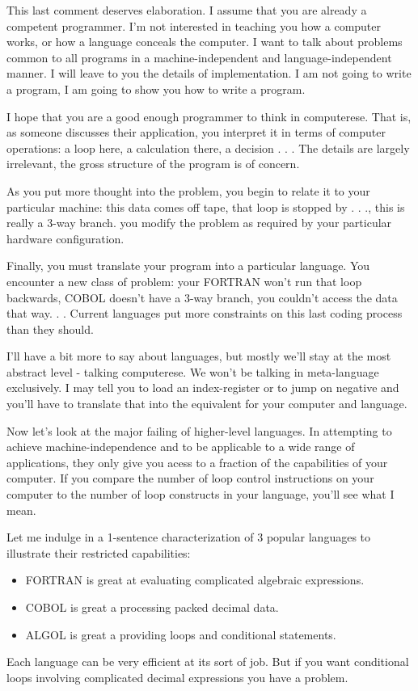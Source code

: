 \documentclass[b5paper, oneside]{book}
\begin{document}
This last comment deserves elaboration. I assume that you are already a competent programmer. I'm not interested in teaching you how a computer works, or how a language conceals the computer. I want to talk about problems common to all programs in a machine-independent and language-independent manner. I will leave to you the details of implementation. I am not going to write a program, I am going to show you how to write a program.

I hope that you are a good enough programmer to think in computerese. That is, as someone discusses their application, you interpret it in terms of computer operations: a loop here, a calculation there, a decision . . . The details are largely irrelevant, the gross structure of the program is of concern.

As you put more thought into the problem, you begin to relate it to your particular machine: this data comes off tape, that loop is stopped by . . ., this is really a 3-way branch. you modify the problem as required by your particular hardware configuration.

Finally, you must translate your program into a particular language. You encounter a new class of problem: your FORTRAN won't run that loop backwards, COBOL doesn't have a 3-way branch, you couldn't access the data that way. . . Current languages put more constraints on this last coding process than they should.

I'll have a bit more to say about languages, but mostly we'll stay at the most abstract level - talking computerese. We won't be talking in meta-language exclusively. I may tell you to load an index-register or to jump on negative and you'll have to translate that into the equivalent for your computer and language.

Now let's look at the major failing of higher-level languages. In attempting to achieve machine-independence and to be applicable to a wide range of applications, they only give you acess to a fraction of the capabilities of your computer. If you compare the number of loop control instructions on your computer to the number of loop constructs in your language, you'll see what I mean.

Let me indulge in a 1-sentence characterization of 3 popular languages to illustrate their restricted capabilities:\begin{itemize}
   \item FORTRAN is great at evaluating complicated algebraic expressions.
   \item COBOL is great a processing packed decimal data.
   \item ALGOL is great a providing loops and conditional statements.\end{itemize}
Each language can be very efficient at its sort of job. But if you want conditional loops involving complicated decimal expressions you have a problem.
\end{document}
